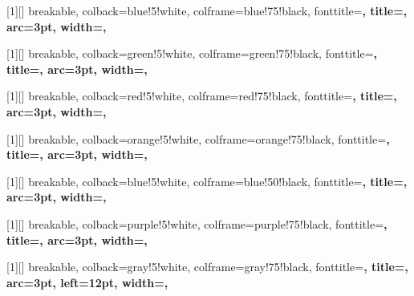 [1][]{
    breakable,
    colback=blue!5!white,
    colframe=blue!75!black,
    fonttitle=\bfseries,
    title={}, 
    arc=3pt,  
    width=\linewidth,
}

[1][]{
    breakable,
    colback=green!5!white,
    colframe=green!75!black,
    fonttitle=\bfseries,
    title={}, 
    arc=3pt,  
    width=\linewidth,
}

[1][]{
    breakable,
    colback=red!5!white,
    colframe=red!75!black,
    fonttitle=\bfseries,
    title={}, 
    arc=3pt,  
    width=\linewidth,
}

[1][]{
    breakable,
    colback=orange!5!white,
    colframe=orange!75!black,
    fonttitle=\bfseries,
    title={}, 
    arc=3pt,  
    width=\linewidth,
}

[1][]{
    breakable,
    colback=blue!5!white,      %
    colframe=blue!50!black,   %
    fonttitle=\bfseries,
    title={}, 
    arc=3pt,                  %
    width=\linewidth,
}

[1][]{
    breakable,
    colback=purple!5!white,      %
    colframe=purple!75!black,    %
    fonttitle=\bfseries,
    title={}, %
    arc=3pt,                    %
    width=\linewidth,           %
}

[1][]{
    breakable,
    colback=gray!5!white,        %
    colframe=gray!75!black,      %
    fonttitle=\bfseries,
    title={}, %
    arc=3pt,
    left=12pt,
    width=\linewidth,
}